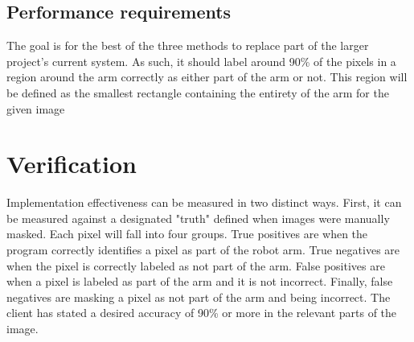 \documentclass[10pt,journal,compsoc, draftclsnofoot,onecolumn]{IEEEtran}
\begin{document}
\subsection{Performance requirements}
The goal is for the best of the three methods to replace part of the larger project’s current system.
As such, it should label around 90\% of the pixels in a region around the arm correctly as either part of the arm or not. This region will be defined as the smallest rectangle containing the entirety of the arm for the given image


\section {Verification}
Implementation effectiveness can be measured in two distinct ways.
First, it can be measured against a designated "truth" defined when images were manually masked.
Each pixel will fall into four groups.
True positives are when the program correctly identifies a pixel as part of the robot arm.
True negatives are when the pixel is correctly labeled as not part of the arm.
False positives are when a pixel is labeled as part of the arm and it is not incorrect.
Finally, false negatives are masking a pixel as not part of the arm and being incorrect.
The client has stated a desired accuracy of 90\% or more in the relevant parts of the image.%
\end{document}
